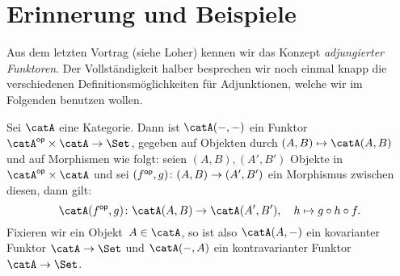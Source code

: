 \chapter{Erinnerung und Beispiele}
Aus dem letzten Vortrag (siehe Loher\cite{talk:loher}) kennen wir das Konzept
\emph{adjungierter Funktoren}. Der Vollständigkeit halber besprechen wir noch
einmal knapp die verschiedenen Definitionsmöglichkeiten für Adjunktionen, welche
wir im Folgenden benutzen wollen.

\begin{thErinnerung}
    Sei $\catA$ eine Kategorie. Dann ist $\catA(\blank,\blank)$ ein Funktor
    $\catA\op\times\catA\to\Set$, gegeben auf Objekten durch 
    $(A,B)\mapsto \catA(A,B)$ und auf Morphismen wie folgt: 
    seien $(A,B),(A',B')$ Objekte in $\catA\op\times\catA$ und sei
    $(f^\mathsf{op},g)\colon (A,B)\to (A',B')$ ein Morphismus zwischen diesen, 
    dann gilt:
    \[ \catA(f\op,g)\colon \catA(A,B)\to \catA(A',B'), \quad 
        h\mapsto g\after h\after f
    . \]
    Fixieren wir ein Objekt~$A\in\catA$, so ist
    also $\catA(A,\blank)$ ein kovarianter Funktor $\catA\to\Set$
    und $\catA(\blank,A)$ ein kontravarianter Funktor $\catA\to\Set$.
\end{thErinnerung}


